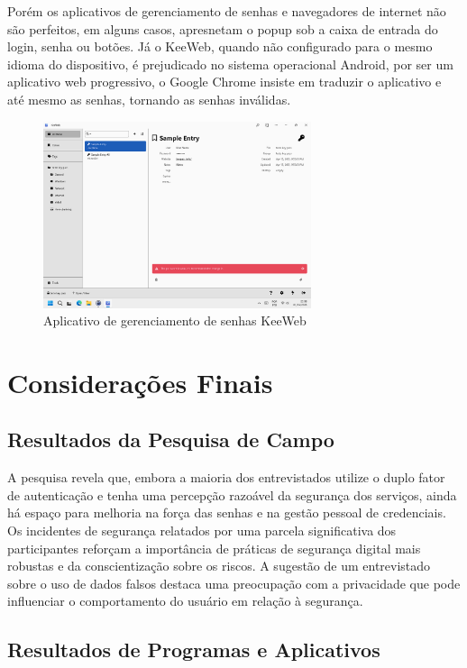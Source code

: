 \documentclass[12pt]{article}
\begin{document}
Porém os aplicativos de gerenciamento de senhas e navegadores de internet não
são perfeitos, em alguns casos, apresnetam o popup sob a caixa de entrada do
login, senha ou botões.
Já o KeeWeb, quando não configurado para o mesmo idioma do dispositivo, é
prejudicado no sistema operacional Android, por ser um aplicativo web progressivo,
o Google Chrome insiste em traduzir o aplicativo e até mesmo as senhas, tornando
as senhas inválidas.

\begin{figure}[h!]
  \centering
  \includegraphics[width=0.7\textwidth]{./assets/keeweb.png}
  \caption{Aplicativo de gerenciamento de senhas KeeWeb}
  \label{fig:KeeWeb}
\end{figure}

\section{Considerações Finais}

\subsection{Resultados da Pesquisa de Campo}

A pesquisa revela que, embora a maioria dos entrevistados utilize o duplo fator de
autenticação e tenha uma percepção razoável da segurança dos serviços, ainda há
espaço para melhoria na força das senhas e na gestão pessoal de credenciais.
Os incidentes de segurança relatados por uma parcela significativa dos participantes
reforçam a importância de práticas de segurança digital mais robustas e da
conscientização sobre os riscos.
A sugestão de um entrevistado sobre o uso de dados falsos destaca uma preocupação
com a privacidade que pode influenciar o comportamento do usuário em relação à
segurança.

\subsection{Resultados de Programas e Aplicativos}
\end{document}
